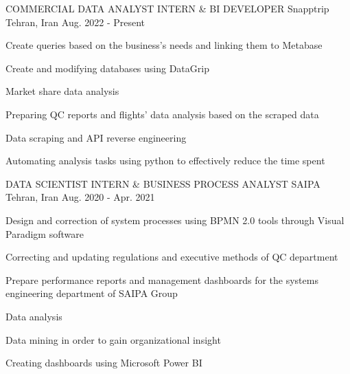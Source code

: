 

\begin{cventries}

  \cventry
    {COMMERCIAL DATA ANALYST INTERN \& BI DEVELOPER} %
    {Snapptrip} %
    {Tehran, Iran} %
    {Aug. 2022 - Present} %
    {
      \begin{cvitems} %
        \item {Create queries based on the business's needs and linking them to Metabase}
        \item {Create and modifying databases using DataGrip}
        \item {Market share data analysis}
        \item {Preparing QC reports and flights' data analysis based on the scraped data}
        \item {Data scraping and API reverse engineering}
        \item {Automating analysis tasks using python to effectively reduce the time spent}
      \end{cvitems}
    }

  \cventry
    {DATA SCIENTIST INTERN \& BUSINESS PROCESS ANALYST} %
    {SAIPA} %
    {Tehran, Iran} %
    {Aug. 2020 - Apr. 2021} %
    {
      \begin{cvitems} %
        \item {Design and correction of system processes using BPMN 2.0 tools through Visual Paradigm software}
        \item {Correcting and updating regulations and executive methods of QC department}
        \item {Prepare performance reports and management dashboards for the systems engineering department of SAIPA Group}
        \item {Data analysis}
        \item {Data mining in order to gain organizational insight}
        \item {Creating dashboards using Microsoft Power BI}
      \end{cvitems}
    }

\end{cventries}
